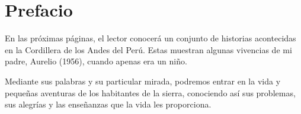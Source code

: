 \cleardoublepage
\newpage
\thispagestyle{empty}
\vfill


\chapter*{Prefacio} %

En las próximas páginas, el lector conocerá un conjunto de historias acontecidas en la Cordillera de los Andes del Perú. 
Estas muestran algunas vivencias de mi padre, Aurelio (1956), cuando apenas era un niño. %

Mediante sus palabras y su particular mirada, podremos entrar en la vida y pequeñas aventuras de los habitantes de la sierra, conociendo así sus problemas, sus alegrías y las enseñanzas que la vida les proporciona.
\vfill

\newpage
\thispagestyle{empty}
